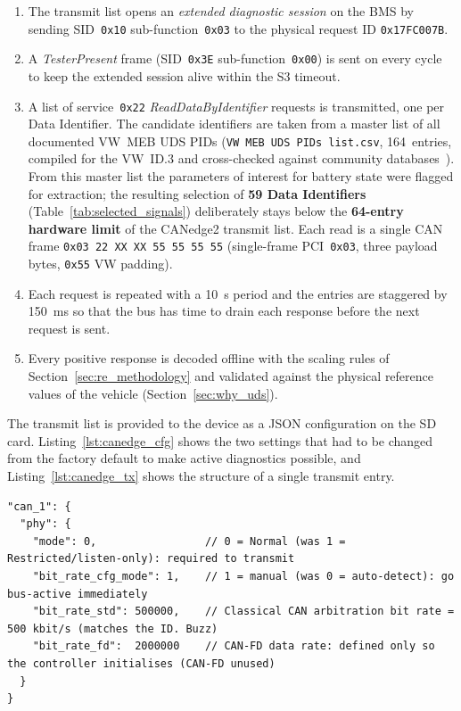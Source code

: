 \documentclass[11pt,a4paper,oneside,parskip=half]{scrreprt}
\providecommand{\hex}{}\renewcommand{\hex}[1]{\texttt{0x#1}}
\begin{document}
\begin{enumerate}
  \item The transmit list opens an \textit{extended diagnostic session} on the BMS by sending SID~\hex{10} sub-function~\hex{03} to the physical request ID \hex{17FC007B}.
  \item A \textit{TesterPresent} frame (SID~\hex{3E} sub-function~\hex{00}) is sent on every cycle to keep the extended session alive within the S3 timeout.
  \item A list of service~\hex{22} \textit{ReadDataByIdentifier} requests is transmitted, one per Data Identifier. The candidate identifiers are taken from a master list of all documented VW~MEB UDS PIDs (\texttt{VW MEB UDS PIDs list.csv}, 164~entries, compiled for the VW~ID.3 and cross-checked against community databases~\cite{opendbc}). From this master list the parameters of interest for battery state were flagged for extraction; the resulting selection of \textbf{59 Data Identifiers} (Table~\ref{tab:selected_signals}) deliberately stays below the \textbf{64-entry hardware limit} of the CANedge2 transmit list. Each read is a single CAN frame \hex{03 22 XX XX 55 55 55 55} (single-frame PCI~\hex{03}, three payload bytes, \hex{55} VW padding).
  \item Each request is repeated with a 10~s period and the entries are staggered by 150~ms so that the bus has time to drain each response before the next request is sent.
  \item Every positive response is decoded offline with the scaling rules of Section~\ref{sec:re_methodology} and validated against the physical reference values of the vehicle (Section~\ref{sec:why_uds}).
\end{enumerate}

The transmit list is provided to the device as a JSON configuration on the SD card. Listing~\ref{lst:canedge_cfg} shows the two settings that had to be changed from the factory default to make active diagnostics possible, and Listing~\ref{lst:canedge_tx} shows the structure of a single transmit entry.

\begin{lstlisting}[caption={CANedge2 PHY configuration changes required for UDS transmission. The factory default is restricted (listen-only) PHY mode with auto bit-rate detection, which never lets the controller transmit.},label={lst:canedge_cfg}]
"can_1": {
  "phy": {
    "mode": 0,                 // 0 = Normal (was 1 = Restricted/listen-only): required to transmit
    "bit_rate_cfg_mode": 1,    // 1 = manual (was 0 = auto-detect): go bus-active immediately
    "bit_rate_std": 500000,    // Classical CAN arbitration bit rate = 500 kbit/s (matches the ID. Buzz)
    "bit_rate_fd":  2000000    // CAN-FD data rate: defined only so the controller initialises (CAN-FD unused)
  }
}
\end{lstlisting}
\end{document}

